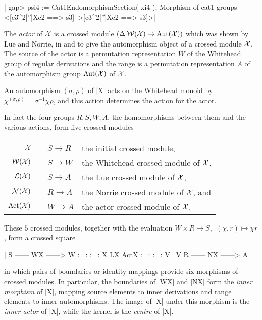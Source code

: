{|    gap> psi4 := Cat1EndomorphismSection( xi4 );
    Morphism of cat1-groups <[c3^2|'\|'|Xc2 ==> s3]-->[c3^2|'\|'|Xc2 ==> s3]>|

\newpage




The \emph{actor} of ${\cal X}$  is a crossed module
$(\Delta \: {\cal W}({\cal X}) \to {\rm Aut}({\cal X}))$
which was shown by Lue and Norrie, in \cite{N2} and \cite{N1} to give
the automorphism object of a crossed module ${\cal X}$.
The source of the actor is a permutation representation $W$ 
of the Whitehead group of regular derivations and the range is a 
permutation representation $A$ of the automorphism group 
${\rm Aut}({\cal X})$ of ${\cal X}$.

An automorphism $( \sigma, \rho )$ of |X| acts on the Whitehead monoid by
$\chi^{(\sigma,\rho)} = \sigma^{-1} \chi \rho$, and this action
determines the action for the actor.

In fact the four groups $R, S, W, A$,  the homomorphisms between them
and the various actions, form five crossed modules\:

\begin{tabular}{rcll}
   ${\cal X}$ &\:& $S \to R$  &  the initial crossed module,                 \\
${\cal W(X)}$ &\:& $S \to W$  &  the Whitehead crossed module of ${\cal X}$, \\
${\cal L(X)}$ &\:& $S \to A$  &  the Lue crossed module of ${\cal X}$,       \\
${\cal N(X)}$ &\:& $R \to A$  &  the Norrie crossed module of ${\cal X}$, and \\
${\rm Act}({\cal X})$ &\:& $W \to A$  &  the actor crossed module of ${\cal X}$.
\end{tabular}

These $5$ crossed modules, together with the evaluation  
$W \times R \to S, \ \ (\chi,r) \mapsto \chi r$, 
form a crossed square\:

|                        S ------ WX ------> W
                        :  \                :
                        :     \             :
                        X        LX        ActX
                        :           \       :
                        :              \    :
                        V                 \ V
                        R ------ NX ------> A  |


in which pairs of boundaries or identity mappings
provide six morphisms of crossed modules.
In particular, the boundaries of |WX| and |NX| form the
\emph{inner morphism} of |X|, mapping source elements to inner derivations
and range elements to inner automorphisms.  The image of |X| under this
morphism is the \emph{inner actor} of |X|, while the kernel 
is the \emph{centre} of |X|.

}
